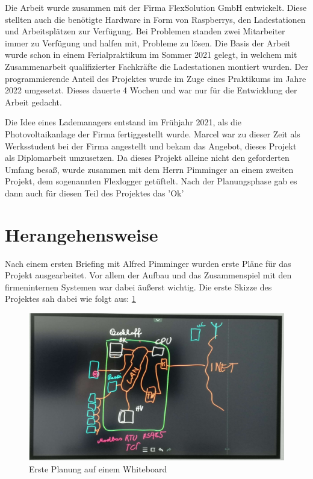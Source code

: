 Die Arbeit wurde zusammen mit der Firma FlexSolution GmbH entwickelt. Diese stellten auch die benötigte Hardware in Form von Raspberrys, den Ladestationen und Arbeitsplätzen zur Verfügung. Bei Problemen standen zwei Mitarbeiter immer zu Verfügung und halfen mit, Probleme zu lösen. Die Basis der Arbeit wurde schon in einem Ferialpraktikum im Sommer 2021 gelegt, in welchem mit Zusammenarbeit qualifizierter Fachkräfte die Ladestationen montiert wurden. Der programmierende Anteil des Projektes wurde im Zuge eines Praktikums im Jahre 2022 umgesetzt. Dieses dauerte 4 Wochen und war nur für die Entwicklung der Arbeit gedacht.


Die Idee eines Lademanagers entstand im Frühjahr 2021, als die Photovoltaikanlage der Firma fertiggestellt wurde. Marcel war zu dieser Zeit als Werksstudent bei der Firma angestellt und bekam das Angebot, dieses Projekt als Diplomarbeit umzusetzen. Da dieses Projekt alleine nicht den geforderten Umfang besaß, wurde zusammen mit dem Herrn Pimminger an einem zweiten Projekt, dem sogenannten Flexlogger getüftelt. Nach der Planungsphase gab es dann auch für diesen Teil des Projektes das 'Ok'


\section{Herangehensweise}


Nach einem ersten Briefing mit Alfred Pimminger wurden erste Pläne für das Projekt ausgearbeitet. Vor allem der Aufbau und das Zusammenspiel mit den firmeninternen Systemen war dabei äußerst wichtig. Die erste Skizze des Projektes sah dabei wie folgt aus:
\ref{fig:impl:ersteSkizze}


\begin{figure}[h t]
\centering
\includegraphics[scale=0.15]{pics/ersteSkizze.jpg}
\caption{Erste Planung auf einem Whiteboard}
\label{fig:impl:ersteSkizze}
\end{figure}



